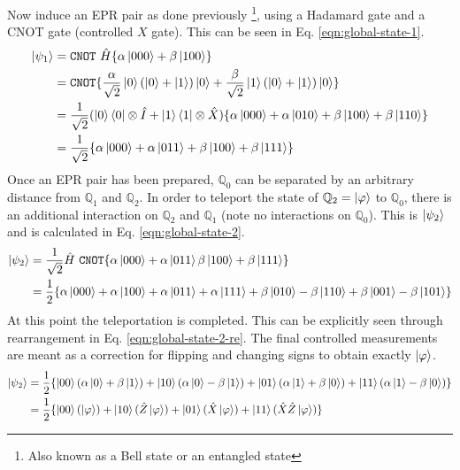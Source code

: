 \documentclass[%
 aip,
cp,  %
 amsmath,amssymb,%
 reprint,%
]{revtex4-2}
\newcommand{\Q}{\mathbb{Q}}
\begin{document}
    Now induce an EPR pair as done previously \footnote{Also known as a Bell state or an entangled state}, using a Hadamard gate and a CNOT gate (controlled $X$ gate). This can be seen in Eq. \eqref{eqn:global-state-1}.
    \begin{align}
        \ket{\psi_1} &= \texttt{CNOT}\ \hat{H}\{\alpha\ket{000} + \beta\ket{100}\} \\
        &= \texttt{CNOT}\{\frac{\alpha}{\sqrt{2}}\ket{0}(\ket{0}+\ket{1})\ket{0} + \frac{\beta}{\sqrt{2}}\ket{1}(\ket{0}+\ket{1})\ket{0}\} \\
        &= \frac{1}{\sqrt{2}}(\ket{0}\bra{0}\otimes\hat{I}+\ket{1}\bra{1}\otimes\hat{X})\{\alpha\ket{000} + \alpha\ket{010} + \beta\ket{100} + \beta\ket{110}\} \label{eqn:global-state-1-intermediate} \\
        &= \frac{1}{\sqrt{2}}\{\alpha\ket{000} + \alpha\ket{011} + \beta\ket{100} + \beta\ket{111}\} \label{eqn:global-state-1}
    \end{align}
Once an EPR pair has been prepared, $\Q_0$ can be separated by an arbitrary distance from $\Q_1$ and $\Q_2$. In order to teleport the state of $\Q_2 = \ket{\varphi}$ to $\Q_0$, there is an additional interaction on $\Q_2$ and $\Q_1$ (note no interactions on $\Q_0$). This is $\ket{\psi_2}$ and is calculated in Eq. \eqref{eqn:global-state-2}.
    \begin{align}
        \ket{\psi_2} &= \frac{1}{\sqrt{2}}\hat{H}\ \texttt{CNOT}\{\alpha\ket{000} + \alpha\ket{011} \beta\ket{100} + \beta\ket{111}\} \\
        &= \frac{1}{2} \{\alpha\ket{000} + \alpha\ket{100} + \alpha\ket{011}+\alpha\ket{111} + \beta\ket{010}-\beta\ket{110} + \beta\ket{001} -\beta\ket{101}\} \label{eqn:global-state-2}
    \end{align}
    At this point the teleportation is completed. This can be explicitly seen through rearrangement in Eq. \eqref{eqn:global-state-2-re}. The final controlled measurements are meant as a correction for flipping and changing signs to obtain exactly $\ket{\varphi}$. %
    \begin{align}
        \ket{\psi_2} &= \frac{1}{2} \{\ket{00}(\alpha\ket{0} + \beta\ket{1}) + \ket{10}(\alpha\ket{0} - \beta\ket{1}) + \ket{01}(\alpha\ket{1}+\beta\ket{0})+\ket{11}(\alpha\ket{1}-\beta\ket{0})\} \\
        &= \frac{1}{2}\{\ket{00}(\ket{\varphi}) + \ket{10}(\hat{Z}\ket{\varphi}) + \ket{01}(\hat{X}\ket{\varphi})+\ket{11}(\hat{X}\hat{Z}\ket{\varphi})\} \label{eqn:global-state-2-re}
    \end{align}
\end{document}
